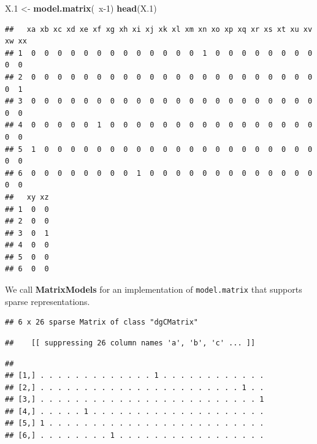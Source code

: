 \documentclass[]{book}
\newenvironment{Shaded}{\begin{snugshade}}{\end{snugshade}}
\newcommand{\KeywordTok}[1]{\textcolor[rgb]{0.13,0.29,0.53}{\textbf{{#1}}}}
\newcommand{\DecValTok}[1]{\textcolor[rgb]{0.00,0.00,0.81}{{#1}}}
\newcommand{\FloatTok}[1]{\textcolor[rgb]{0.00,0.00,0.81}{{#1}}}
\newcommand{\StringTok}[1]{\textcolor[rgb]{0.31,0.60,0.02}{{#1}}}
\newcommand{\CommentTok}[1]{\textcolor[rgb]{0.56,0.35,0.01}{\textit{{#1}}}}
\newcommand{\NormalTok}[1]{{#1}}
\theoremstyle{definition}
\theoremstyle{definition}
\theoremstyle{remark}
\begin{document}
\begin{Shaded}
\begin{Highlighting}[]
\NormalTok{X}\FloatTok{.1} \NormalTok{<-}\StringTok{ }\KeywordTok{model.matrix}\NormalTok{(~x}\DecValTok{-1}\NormalTok{)}
\KeywordTok{head}\NormalTok{(X}\FloatTok{.1}\NormalTok{)}
\end{Highlighting}
\end{Shaded}

\begin{verbatim}
##   xa xb xc xd xe xf xg xh xi xj xk xl xm xn xo xp xq xr xs xt xu xv xw xx
## 1  0  0  0  0  0  0  0  0  0  0  0  0  0  1  0  0  0  0  0  0  0  0  0  0
## 2  0  0  0  0  0  0  0  0  0  0  0  0  0  0  0  0  0  0  0  0  0  0  0  1
## 3  0  0  0  0  0  0  0  0  0  0  0  0  0  0  0  0  0  0  0  0  0  0  0  0
## 4  0  0  0  0  0  1  0  0  0  0  0  0  0  0  0  0  0  0  0  0  0  0  0  0
## 5  1  0  0  0  0  0  0  0  0  0  0  0  0  0  0  0  0  0  0  0  0  0  0  0
## 6  0  0  0  0  0  0  0  0  1  0  0  0  0  0  0  0  0  0  0  0  0  0  0  0
##   xy xz
## 1  0  0
## 2  0  0
## 3  0  1
## 4  0  0
## 5  0  0
## 6  0  0
\end{verbatim}

We call \textbf{MatrixModels} for an implementation of
\texttt{model.matrix} that supports sparse representations.

\begin{Shaded}
\end{Shaded}

\begin{verbatim}
## 6 x 26 sparse Matrix of class "dgCMatrix"
\end{verbatim}

\begin{verbatim}
##    [[ suppressing 26 column names 'a', 'b', 'c' ... ]]
\end{verbatim}

\begin{verbatim}
##                                                         
## [1,] . . . . . . . . . . . . . 1 . . . . . . . . . . . .
## [2,] . . . . . . . . . . . . . . . . . . . . . . . 1 . .
## [3,] . . . . . . . . . . . . . . . . . . . . . . . . . 1
## [4,] . . . . . 1 . . . . . . . . . . . . . . . . . . . .
## [5,] 1 . . . . . . . . . . . . . . . . . . . . . . . . .
## [6,] . . . . . . . . 1 . . . . . . . . . . . . . . . . .
\end{verbatim}
\end{document}
